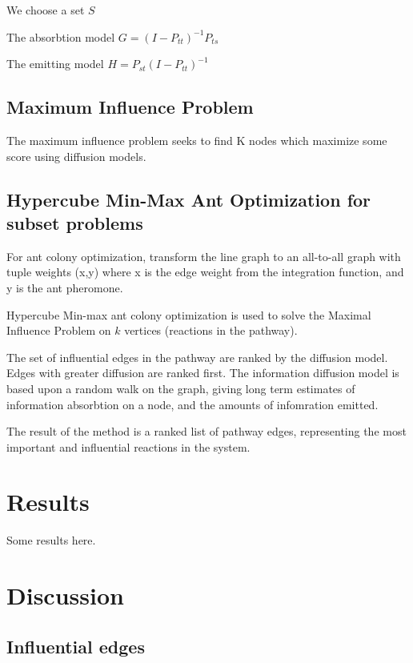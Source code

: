 \documentclass[twoside]{article}
\begin{document}
\begin{multicols}{2}
We choose a set $S$

The absorbtion model $G = (I - P_{tt})^{-1} P_{ts}$

The emitting model $H = P_{st} (I - P_{tt})^{-1}$

\subsection{Maximum Influence Problem}

The maximum influence problem seeks to find K nodes which maximize
some score using diffusion models.

\subsection{Hypercube Min-Max Ant Optimization for subset problems}

For ant colony optimization, transform the line graph to an 
all-to-all graph with tuple
weights (x,y) where x is the edge weight from the integration
function, and y is the ant pheromone.

Hypercube Min-max ant colony optimization is used to solve the
Maximal Influence Problem on $k$ vertices (reactions in the pathway).

The set of influential edges in the pathway are ranked by the
diffusion model. Edges with greater diffusion are ranked first.
The information diffusion model is based upon a random walk on the
graph, giving long term estimates of information absorbtion on a node,
and the amounts of infomration emitted.

The result of the method is a ranked list of pathway edges,
representing the most important and influential reactions in the system.



\section{Results}

Some results here.



\section{Discussion}

\subsection{Influential edges}


\end{multicols}
\end{document}
